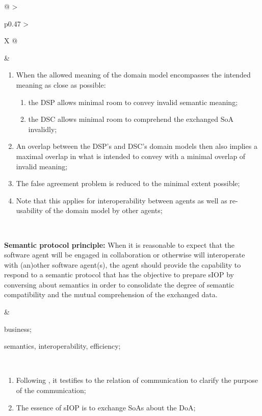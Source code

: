 \begin{xltabular}[l]{\linewidth}{@{} >{\small\raggedright\arraybackslash}p{0.47\linewidth} >{\small\raggedright\arraybackslash}X @{}}
\begin{enumerate}[left=6pt, nosep]
\end{enumerate}
&
\begin{enumerate}[left=10pt, nosep]
  \item When the allowed meaning of the domain model encompasses the intended meaning as close as possible:
  \begin{enumerate}
    \item the DSP allows minimal room to convey invalid semantic meaning;
    \item the DSC allows minimal room to comprehend the exchanged SoA invalidly;
  \end{enumerate}
  \item An overlap between the DSP's and DSC's domain models then also implies a maximal overlap in what is intended to convey with a minimal overlap of invalid meaning; 
  \item The false agreement problem is reduced to the minimal extent possible;
  \item Note that this applies for interoperability between agents as well as re-usability of the domain model by other agents;
\end{enumerate} \\
%
%
%
\begin{mmdp}\label{dp:spp}{\bfseries Semantic protocol principle:}
\quad When it is reasonable to expect that the software agent will be engaged in collaboration or otherwise will interoperate with (an)other software agent(s), the agent should provide the capability to respond to a semantic protocol that has the objective to prepare sIOP by conversing about semantics in order to consolidate the degree of semantic compatibility and the mutual comprehension of the exchanged data.
\end{mmdp}
&
\begin{description}[labelwidth=3.7cm,leftmargin=3.7cm+1ex,nosep,topsep=2ex,labelsep=1ex,font=\bfseries]
  \item[Type of information:] business;
  \item[Quality attributes:] semantics, interoperability, efficiency;
\end{description} \\
\begin{enumerate}[left=6pt, nosep]
  \item Following \cite{Grice:1991BT}, it testifies to the relation of communication to clarify the purpose of the communication;
  \item The essence of sIOP is to exchange SoAs about the DoA;

\end{enumerate}
\end{xltabular}
